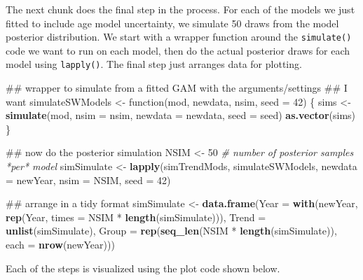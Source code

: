 \documentclass[12pt,]{article}
\newenvironment{Shaded}{\begin{snugshade}}{\end{snugshade}}
\newcommand{\KeywordTok}[1]{\textcolor[rgb]{0.13,0.29,0.53}{\textbf{{#1}}}}
\newcommand{\DataTypeTok}[1]{\textcolor[rgb]{0.13,0.29,0.53}{{#1}}}
\newcommand{\DecValTok}[1]{\textcolor[rgb]{0.00,0.00,0.81}{{#1}}}
\newcommand{\StringTok}[1]{\textcolor[rgb]{0.31,0.60,0.02}{{#1}}}
\newcommand{\CommentTok}[1]{\textcolor[rgb]{0.56,0.35,0.01}{\textit{{#1}}}}
\newcommand{\NormalTok}[1]{{#1}}
\begin{document}
The next chunk does the final step in the process. For each of the
models we just fitted to include age model uncertainty, we simulate 50
draws from the model posterior distribution. We start with a wrapper
function around the \texttt{simulate()} code we want to run on each
model, then do the actual posterior draws for each model using
\texttt{lapply()}. The final step just arranges data for plotting.

\begin{Shaded}
\begin{Highlighting}[]
\NormalTok{## wrapper to simulate from a fitted GAM with the arguments/settings}
\NormalTok{## I want}
\NormalTok{simulateSWModels <-}\StringTok{ }\NormalTok{function(mod, newdata, nsim, }\DataTypeTok{seed =} \DecValTok{42}\NormalTok{) \{}
    \NormalTok{sims <-}\StringTok{ }\KeywordTok{simulate}\NormalTok{(mod, }\DataTypeTok{nsim =} \NormalTok{nsim, }\DataTypeTok{newdata =} \NormalTok{newdata, }\DataTypeTok{seed =} \NormalTok{seed)}
    \KeywordTok{as.vector}\NormalTok{(sims)}
\NormalTok{\}}

\NormalTok{## now do the posterior simulation}
\NormalTok{NSIM <-}\StringTok{ }\DecValTok{50}     \CommentTok{# number of posterior samples *per* model}
\NormalTok{simSimulate <-}\StringTok{ }\KeywordTok{lapply}\NormalTok{(simTrendMods, simulateSWModels, }\DataTypeTok{newdata =} \NormalTok{newYear,}
                      \DataTypeTok{nsim =} \NormalTok{NSIM, }\DataTypeTok{seed =} \DecValTok{42}\NormalTok{)}

\NormalTok{## arrange in a tidy format}
\NormalTok{simSimulate <-}
\StringTok{  }\KeywordTok{data.frame}\NormalTok{(}\DataTypeTok{Year  =} \KeywordTok{with}\NormalTok{(newYear,}
                          \KeywordTok{rep}\NormalTok{(Year, }\DataTypeTok{times =} \NormalTok{NSIM *}\StringTok{ }\KeywordTok{length}\NormalTok{(simSimulate))),}
             \DataTypeTok{Trend =} \KeywordTok{unlist}\NormalTok{(simSimulate),}
             \DataTypeTok{Group =} \KeywordTok{rep}\NormalTok{(}\KeywordTok{seq_len}\NormalTok{(NSIM *}\StringTok{ }\KeywordTok{length}\NormalTok{(simSimulate)),}
                         \DataTypeTok{each =} \KeywordTok{nrow}\NormalTok{(newYear)))}
\end{Highlighting}
\end{Shaded}

Each of the steps is visualized using the plot code shown below.
\end{document}
